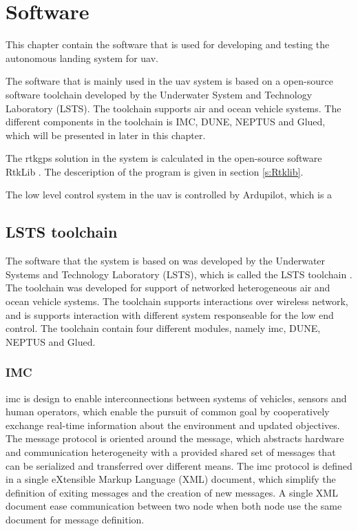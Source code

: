 \chapter{Software}
This chapter contain the software that is used for developing and testing the autonomous landing system for uav. 

The software that is mainly used in the uav system is based on a open-source software toolchain developed by the Underwater System and Technology Laboratory (LSTS). The toolchain supports air and ocean vehicle systems. The different components in the toolchain is IMC, DUNE, NEPTUS and Glued, which will be presented in later in this chapter. 

The rtkgps solution in the system is calculated in the open-source software RtkLib \citep{takasu2009development}. The desceription of the program is given in section \ref{s:Rtklib}.

The low level control system in the uav is controlled by Ardupilot, which is a 
\section{LSTS toolchain}
The software that the system is based on was developed by the Underwater Systems and Technology Laboratory (LSTS), which is called the LSTS toolchain \citep{pinto2013lsts}. The toolchain was developed for support of networked heterogeneous air and ocean vehicle systems. The toolchain supports interactions over wireless network, and is supports interaction with different system responseable for the low end control. The toolchain contain four different modules, namely \gls{imc}, DUNE, NEPTUS and Glued.
\subsection{IMC}
\gls{imc} \citep{martins2009imc} is design to enable interconnections between systems of vehicles, sensors and human operators, which enable the pursuit of common goal by cooperatively exchange real-time information about the environment and updated objectives. The message protocol is oriented around the message, which abstracts hardware and communication heterogeneity with a provided shared set of messages that can be serialized and transferred over different means. The \gls{imc} protocol is defined in a single eXtensible Markup Language (XML) document, which simplify the definition of exiting messages and the creation of new messages. A single XML document ease communication between two node when both node use the same document for message definition. 
